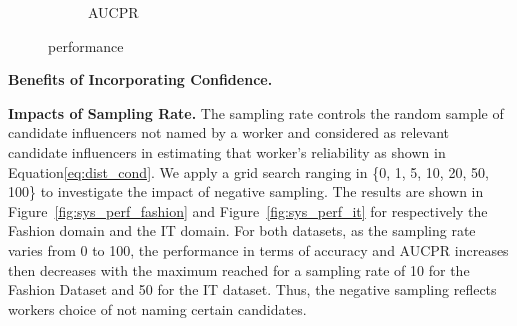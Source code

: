 \begin{figure}[htb]
\begin{subfigure}[t]{0.47\columnwidth}
    \vspace{-0.15in}
        \caption{AUCPR\label{fig:aucpr}} 
    \end{subfigure}%
   \caption{\sys performance} \label{fig:variants}
\end{figure}

\smallskip
\noindent\textbf{Benefits of Incorporating Confidence.}

\smallskip
\noindent\textbf{Impacts of Sampling Rate.}
The sampling rate controls the random sample of candidate influencers not named by a worker 
and considered as relevant candidate influencers in estimating that worker's reliability as shown in
Equation\ref{eq:dist_cond}. We apply a grid search ranging in \{0, 1, 5, 10, 20, 50, 100\} to
investigate the impact of negative sampling. The results are shown in Figure~\ref{fig:sys_perf_fashion}
and Figure~\ref{fig:sys_perf_it} for respectively the Fashion domain and the IT domain.
For both datasets, as the sampling rate varies from 0 to 100, the performance in terms of accuracy and 
AUCPR increases then decreases with the maximum reached for a sampling rate of 10 for the Fashion Dataset
and 50 for the IT dataset. Thus, the negative sampling reflects workers choice of not naming certain candidates.


